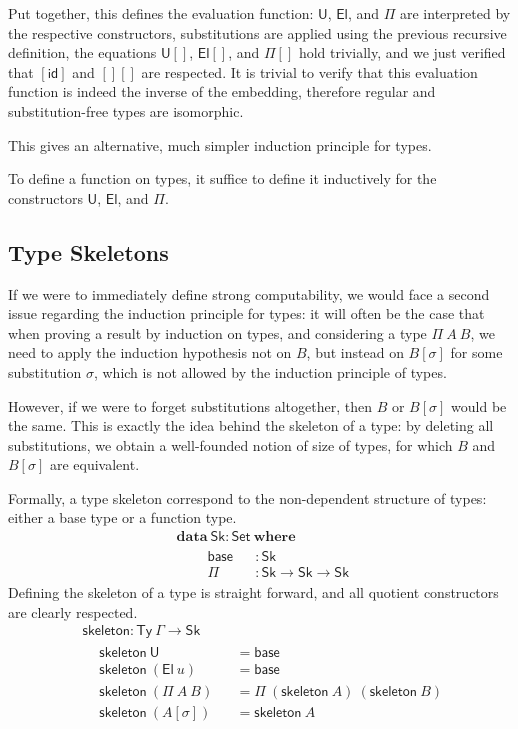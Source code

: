 \documentclass[a4paper,english]{lipics-v2019}
\newcommand{\agdaSymb}[1]{\mathsf{#1}}
\newcommand{\agdaKW}[1]{\mathbf{#1}}
\newcommand{\ind}{\hspace{1em}}
\newcommand{\data}{\agdaKW{data}}
\newcommand{\where}{\agdaKW{where}}
\newcommand{\Set}{\agdaSymb{Set}}
\newcommand{\Ty}{\agdaSymb{Ty}}
\newcommand{\id}{\agdaSymb{id}}
\newcommand{\U}{\agdaSymb{U}}
\newcommand{\El}{\agdaSymb{El}}
\newcommand{\Sk}{\agdaSymb{Sk}}
\newcommand{\base}{\agdaSymb{base}}
\newcommand{\skel}{\agdaSymb{skeleton}}
\begin{document}
Put together, this defines the evaluation function: $\U$, $\El$, and $\Pi$ are
interpreted by the respective constructors, substitutions are applied using the
previous recursive definition, the equations $\U[]$, $\El[]$, and $\Pi[]$ hold
trivially, and we just verified that $[\id]$ and $[][]$ are respected.
It is trivial to verify that this evaluation function is indeed the inverse of
the embedding, therefore regular and substitution-free types are isomorphic.

This gives an alternative, much simpler induction principle for types.
\begin{lemma}
  \label{lem:typeInduction}
  To define a function on types, it suffice to define it inductively for the
  constructors $\U$, $\El$, and $\Pi$.
\end{lemma}

\subsection{Type Skeletons}
If we were to immediately define strong computability, we would face a second
issue regarding the induction principle for types: it will often be the case
that when proving a result by induction on types, and considering a type
$\Pi\ A\ B$, we need to apply the induction hypothesis not on $B$, but instead
on $B[\sigma]$ for some substitution $\sigma$, which is not allowed by the
induction principle of types.

However, if we were to forget substitutions altogether, then $B$ or $B[\sigma]$
would be the same. This is exactly the idea behind the skeleton of a type:
by deleting all substitutions, we obtain a well-founded notion of size of types,
for which $B$ and $B[\sigma]$ are equivalent.

Formally, a type skeleton correspond to the non-dependent structure of types:
either a base type or a function type.
\begin{align*}
  & \data\ \Sk : \Set\ \where \\ & \ind
  \begin{alignedat}{2}
    & \base && : \Sk \\
    & \Pi && : \Sk \to \Sk \to \Sk
  \end{alignedat}
\end{align*}
Defining the skeleton of a type is straight forward, and all quotient
constructors are clearly respected.
\begin{align*}
  & \skel : \Ty\ \Gamma \to \Sk \\ &
  \begin{alignedat}{2}
    & \skel\ \U && = \base \\
    & \skel\ (\El\ u) && = \base \\
    & \skel\ (\Pi\ A\ B) && = \Pi\ (\skel\ A)\ (\skel\ B) \\
    & \skel\ (A[\sigma]) && = \skel\ A
  \end{alignedat}
\end{align*}
\end{document}
